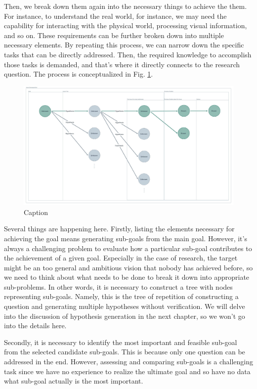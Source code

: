 \documentclass{book}
\begin{document}
Then, we break down them again into the necessary things to achieve the them. For instance, to understand the real world, for instance, we may need the capability for interacting with the physical world, processing visual information, and so on. These requirements can be further broken down into multiple necessary elements. By repeating this process, we can narrow down the specific tasks that can be directly addressed. Then, the required knowledge to accomplish those tasks is demanded, and that's where it directly connects to the research question. The process is conceptualized in Fig. \ref{fig:unknown_tree}.


\begin{figure}[htb]
    \centering
    \includegraphics[width=\textwidth]{figs/unknown_tree.jpeg}
    \caption{Caption}
    \label{fig:unknown_tree}
\end{figure}

Several things are happening here. Firstly, listing the elements necessary for achieving the goal means generating sub-goals from the main goal. However, it's always a challenging problem to evaluate how a particular sub-goal contributes to the achievement of a given goal. Especially in the case of research, the target might be an too general and ambitious vision that nobody has achieved before, so we need to think about what needs to be done to break it down into appropriate sub-problems. In other words, it is necessary to construct a tree with nodes representing sub-goals. Namely, this is the tree of repetition of constructing a question and generating multiple hypotheses without verification. We will delve into the discussion of hypothesis generation in the next chapter, so we won't go into the details here.

Secondly, it is necessary to identify the most important and feasible sub-goal from the selected candidate sub-goals. This is because only one question can be addressed in the end. However, assessing and comparing sub-goals is a challenging task since we have no experience to realize the ultimate goal and so have no data what sub-goal actually is the most important.
\end{document}
